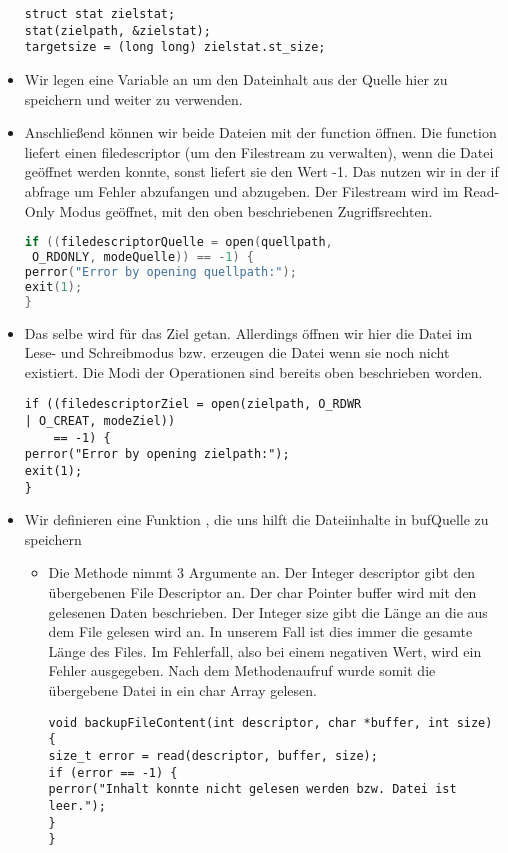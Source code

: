 \begin{itemize}
\begin{lstlisting}
struct stat zielstat;
stat(zielpath, &zielstat);
targetsize = (long long) zielstat.st_size;
\end{lstlisting}

\item Wir legen eine Variable  an um den Dateinhalt
aus der Quelle hier zu speichern und weiter zu verwenden.

 \item Anschließend können wir beide Dateien mit der function  öffnen.
 Die function liefert einen filedescriptor (um den Filestream zu verwalten),
 wenn die Datei geöffnet werden konnte,
 sonst liefert sie den Wert -1. Das nutzen wir in der if abfrage um Fehler abzufangen
 und abzugeben.
 Der Filestream wird im Read-Only Modus geöffnet, mit den oben beschriebenen
 Zugriffsrechten.
 \begin{lstlisting}[language=C]
if ((filedescriptorQuelle = open(quellpath,
 O_RDONLY, modeQuelle)) == -1) {
perror("Error by opening quellpath:");
exit(1);
}
 \end{lstlisting}

\item Das selbe wird für das Ziel getan. Allerdings öffnen wir hier die
Datei im Lese- und Schreibmodus bzw. erzeugen die Datei wenn sie noch
nicht existiert. Die Modi der Operationen sind bereits oben beschrieben worden.
\begin{lstlisting}
if ((filedescriptorZiel = open(zielpath, O_RDWR
| O_CREAT, modeZiel))
	== -1) {
perror("Error by opening zielpath:");
exit(1);
}
\end{lstlisting}

\item Wir definieren eine Funktion ,
die uns hilft die Dateiinhalte in bufQuelle zu speichern
\begin{itemize}
	\item Die Methode nimmt 3 Argumente an.
	Der Integer descriptor gibt den übergebenen File Descriptor an.
	Der char Pointer buffer wird mit den gelesenen Daten beschrieben.
	Der Integer size gibt die Länge an die aus dem File gelesen wird an.
	In unserem Fall ist dies immer die gesamte Länge des Files.
	Im Fehlerfall, also bei einem negativen Wert, wird ein Fehler ausgegeben.
	Nach dem Methodenaufruf wurde somit die übergebene Datei in ein
	char Array gelesen.
	\begin{lstlisting}
void backupFileContent(int descriptor, char *buffer, int size) {
size_t error = read(descriptor, buffer, size);
if (error == -1) {
perror("Inhalt konnte nicht gelesen werden bzw. Datei ist leer.");
}
}
	\end{lstlisting}


\end{itemize}
\end{itemize}
